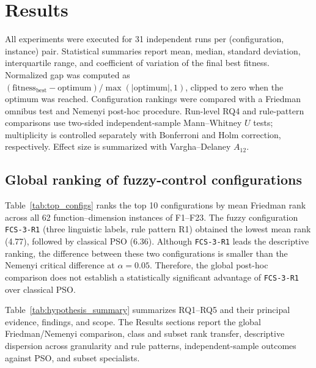 \section{Results}
\label{sec:results}

All experiments were executed for 31 independent runs per (configuration, instance) pair. Statistical summaries report mean, median, standard deviation, interquartile range, and coefficient of variation of the final best fitness. Normalized gap was computed as $(\text{fitness}_{\text{best}} - \text{optimum}) / \max(|\text{optimum}|, 1)$, clipped to zero when the optimum was reached. Configuration rankings were compared with a Friedman omnibus test and Nemenyi post-hoc procedure. Run-level RQ4 and rule-pattern comparisons use two-sided independent-sample Mann--Whitney $U$ tests; multiplicity is controlled separately with Bonferroni and Holm correction, respectively. Effect size is summarized with Vargha--Delaney $A_{12}$.

\subsection{Global ranking of fuzzy-control configurations}
\label{subsec:results_global}

Table~\ref{tab:top_configs} ranks the top 10 configurations by mean Friedman rank across all 62 function--dimension instances of F1--F23. The fuzzy configuration \texttt{FCS-3-R1} (three linguistic labels, rule pattern R1) obtained the lowest mean rank (4.77), followed by classical PSO (6.36). Although \texttt{FCS-3-R1} leads the descriptive ranking, the difference between these two configurations is smaller than the Nemenyi critical difference at $\alpha=0.05$. Therefore, the global post-hoc comparison does not establish a statistically significant advantage of \texttt{FCS-3-R1} over classical PSO.




Table~\ref{tab:hypothesis_summary} summarizes RQ1--RQ5 and their principal evidence, findings, and scope. The Results sections report the global Friedman/Nemenyi comparison, class and subset rank transfer, descriptive dispersion across granularity and rule patterns, independent-sample outcomes against PSO, and subset specialists.



